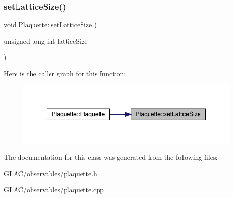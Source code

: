 \subsubsection{\texorpdfstring{setLatticeSize()}{setLatticeSize()}}
{\footnotesize\ttfamily void Plaquette\+::set\+Lattice\+Size (\begin{DoxyParamCaption}\item[{unsigned long int}]{lattice\+Size }\end{DoxyParamCaption})}

Here is the caller graph for this function\+:
\nopagebreak
\begin{figure}[H]
\begin{center}
\leavevmode
\includegraphics[width=348pt]{class_plaquette_a011e1ca450fb40273ec8efa6d094c279_icgraph}
\end{center}
\end{figure}


The documentation for this class was generated from the following files\+:\begin{DoxyCompactItemize}
\item 
G\+L\+A\+C/observables/\mbox{\hyperlink{plaquette_8h}{plaquette.\+h}}\item 
G\+L\+A\+C/observables/\mbox{\hyperlink{plaquette_8cpp}{plaquette.\+cpp}}\end{DoxyCompactItemize}
